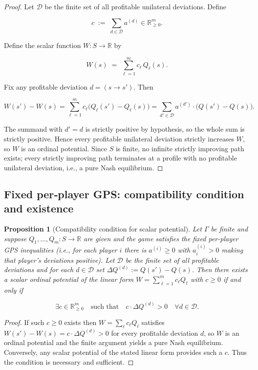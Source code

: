 \documentclass[11pt]{article}
\newtheorem{proposition}[theorem]{Proposition}
\begin{document}
\begin{proof}
Let $\mathcal D$ be the finite set of all profitable unilateral deviations. Define


\[
c \;:=\; \sum_{d\in\mathcal D} a^{(d)} \in\mathbb R^m_{\ge0}.
\]


Define the scalar function $W:S\to\mathbb R$ by


\[
W(s)\;=\;\sum_{\ell=1}^m c_\ell\,Q_\ell(s).
\]


Fix any profitable deviation $d=(s\to s')$. Then


\[
W(s')-W(s)=\sum_{\ell=1}^m c_\ell\big(Q_\ell(s')-Q_\ell(s)\big)
=\sum_{d'\in\mathcal D} a^{(d')}\cdot\big(Q(s')-Q(s)\big).
\]


The summand with $d'=d$ is strictly positive by hypothesis, so the whole sum is strictly positive. Hence every profitable unilateral deviation strictly increases $W$, so $W$ is an ordinal potential. Since $S$ is finite, no infinite strictly improving path exists; every strictly improving path terminates at a profile with no profitable unilateral deviation, i.e., a pure Nash equilibrium.
\end{proof}

\subsection{Fixed per‑player GPS: compatibility condition and existence}

\begin{proposition}[Compatibility condition for scalar potential]
Let $\Gamma$ be finite and suppose $Q_1,\dots,Q_m:S\to\mathbb R$ are given and the game satisfies the fixed per‑player GPS inequalities (i.e., for each player $i$ there is $a^{(i)}\ge0$ with $a^{(i)}_i>0$ making that player's deviations positive). Let $\mathcal D$ be the finite set of all profitable deviations and for each $d\in\mathcal D$ set $\Delta Q^{(d)}:=Q(s')-Q(s)$. Then there exists a scalar ordinal potential of the linear form $W=\sum_{\ell=1}^m c_\ell Q_\ell$ with $c\ge0$ if and only if


\[
\exists c\in\mathbb R^m_{\ge0}\quad\text{such that}\quad c\cdot\Delta Q^{(d)}>0\quad\forall d\in\mathcal D.
\]


\end{proposition}

\begin{proof}
If such $c\ge0$ exists then $W=\sum_\ell c_\ell Q_\ell$ satisfies $W(s')-W(s)=c\cdot\Delta Q^{(d)}>0$ for every profitable deviation $d$, so $W$ is an ordinal potential and the finite argument yields a pure Nash equilibrium. Conversely, any scalar potential of the stated linear form provides such a $c$. Thus the condition is necessary and sufficient.
\end{proof}
\end{document}
